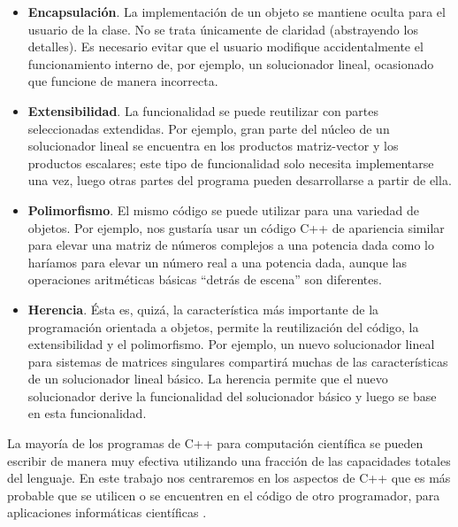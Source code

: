 \begin{itemize}
\item \textbf{Encapsulación}. La implementación de un objeto se mantiene oculta para el usuario de la clase. No se trata únicamente de claridad (abstrayendo los detalles). Es necesario evitar que el usuario modifique accidentalmente el funcionamiento interno de, por ejemplo, un solucionador lineal, ocasionado que funcione de manera incorrecta.
\item \textbf{Extensibilidad}. La funcionalidad se puede reutilizar con partes seleccionadas extendidas. Por ejemplo, gran parte del núcleo de un solucionador lineal se encuentra en los productos matriz-vector y los productos escalares; este tipo de funcionalidad solo necesita implementarse una vez, luego otras partes del programa pueden desarrollarse a partir de ella.
\item \textbf{Polimorfismo}. El mismo código se puede utilizar para una variedad de objetos. Por ejemplo, nos gustaría usar un código C++ de apariencia similar para elevar una matriz de números complejos a una potencia dada como lo haríamos para elevar un número real a una potencia dada, aunque las operaciones aritméticas básicas ``detrás de escena'' son diferentes.
\item \textbf{Herencia}. Ésta es, quizá, la característica más importante de la programación orientada a objetos, permite la reutilización del código, la extensibilidad y el polimorfismo. Por ejemplo, un nuevo solucionador lineal para sistemas de matrices singulares compartirá muchas de las características de un solucionador lineal básico. La herencia permite que el nuevo solucionador derive la funcionalidad del solucionador básico y luego se base en esta funcionalidad.
\end{itemize}

La mayoría de los programas de C++ para computación científica se pueden escribir de manera muy efectiva utilizando una fracción de las capacidades totales del lenguaje. En este trabajo nos centraremos en los aspectos de C++ que es más probable que se utilicen o se encuentren en el código de otro programador, para aplicaciones informáticas científicas \cite{Pitt2017}. 



